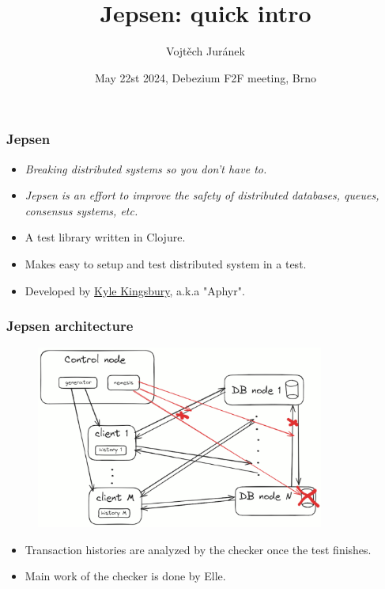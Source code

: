 \documentclass[10pt,utf8]{beamer}
\title{Jepsen: quick intro}
\author{Vojtěch Juránek}
\institute[Red Hat]{Red Hat}
\date{May 22st 2024, Debezium F2F meeting, Brno}
\begin{document}
\begin{frame}
    \titlepage
\end{frame}

\begin{frame}
    \frametitle{Jepsen}
    \begin{itemize}
      \item \textit{Breaking distributed systems so you don't have to.}
      \item \textit{Jepsen is an effort to improve the safety of distributed databases, queues, consensus systems, etc.} 
    \end{itemize}
    
    \vspace{1cm}
    
    \begin{itemize}
      \item A test library written in Clojure.
      \item Makes easy to setup and test distributed system in a test.
      \item Developed by \color{blue}\href{https://aphyr.com/about}{Kyle Kingsbury}\color{black}, a.k.a "Aphyr".
    \end{itemize}
\end{frame}

\begin{frame}
    \frametitle{Jepsen architecture}
    \begin{figure}
        \centering
        \includegraphics[height=6cm]{./img/jepsen_nodes.eps}
    \end{figure}
    \begin{itemize}
      \item Transaction histories are analyzed by the checker once the test finishes. \\
      \item Main work of the checker is done by Elle.
    \end{itemize}
\end{frame}
\end{document}
